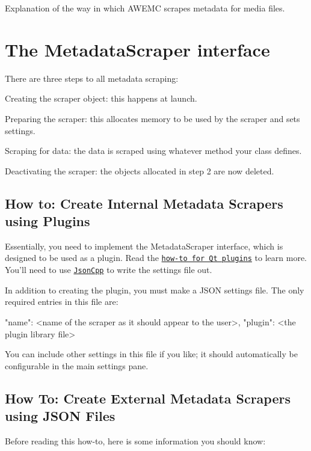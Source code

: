 Explanation of the way in which A\-W\-E\-M\-C scrapes metadata for media files.

\section*{The Metadata\-Scraper interface}

There are three steps to all metadata scraping\-:


\begin{DoxyEnumerate}
\item Creating the scraper object\-: this happens at launch.
\item Preparing the scraper\-: this allocates memory to be used by the scraper and sets settings.
\item Scraping for data\-: the data is scraped using whatever method your class defines.
\item Deactivating the scraper\-: the objects allocated in step 2 are now deleted.
\end{DoxyEnumerate}

\subsection*{How to\-: Create Internal Metadata Scrapers using Plugins}

Essentially, you need to implement the {\ttfamily Metadata\-Scraper} interface, which is designed to be used as a plugin. Read the \href{http://qt-project.org/doc/qt-4.8/plugins-howto.html}{\tt how-\/to for Qt plugins} to learn more. You'll need to use \href{http://jsoncpp.sourceforge.net}{\tt Json\-Cpp} to write the settings file out.

In addition to creating the plugin, you must make a J\-S\-O\-N settings file. The only required entries in this file are\-: \begin{DoxyVerb}"name": <name of the scraper as it should appear to the user>,
"plugin": <the plugin library file>
\end{DoxyVerb}


You can include other settings in this file if you like; it should automatically be configurable in the main settings pane.

\subsection*{How To\-: Create External Metadata Scrapers using J\-S\-O\-N Files}

Before reading this how-\/to, here is some information you should know\-:


